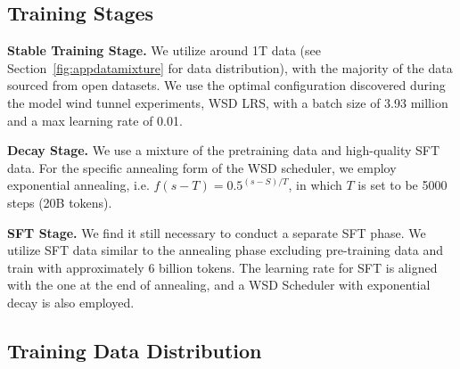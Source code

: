 \subsection{Training Stages} 

\textbf{Stable Training Stage.}
We utilize around 1T data (see Section~\ref{fig:appdatamixture} for data distribution), with the majority of the data sourced from open datasets. We use the optimal configuration discovered during the model wind tunnel experiments, WSD LRS, with a batch size of 3.93 million and a max learning rate of 0.01.

\textbf{Decay Stage.} We use a mixture of the pretraining data and high-quality SFT data.
For the specific annealing form of the WSD scheduler, we employ exponential annealing, i.e. $f(s-T)=  0.5^{(s-S)/T}$, in which $T$ is set to be 5000 steps (20B tokens).

\textbf{SFT Stage.} We find it still necessary to conduct a separate SFT phase. We utilize SFT data similar to the annealing phase excluding pre-training data and train with approximately 6 billion tokens. The learning rate for SFT is aligned with the one at the end of annealing, and a WSD Scheduler with exponential decay is also employed.


\subsection{Training Data Distribution}
\label{sec:appdatadistrbution}


